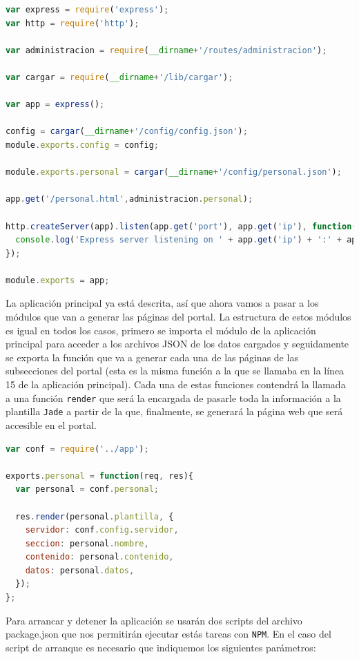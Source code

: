 \begin{lstlisting}[language=javascript,caption={Archivo app.js},label={lst:appjs}]
var express = require('express');
var http = require('http');

var administracion = require(__dirname+'/routes/administracion');

var cargar = require(__dirname+'/lib/cargar');

var app = express();

config = cargar(__dirname+'/config/config.json');
module.exports.config = config;

module.exports.personal = cargar(__dirname+'/config/personal.json');

app.get('/personal.html',administracion.personal);

http.createServer(app).listen(app.get('port'), app.get('ip'), function(){
  console.log('Express server listening on ' + app.get('ip') + ':' + app.get('port'));
});

module.exports = app;
\end{lstlisting}

La aplicación principal ya está descrita, así que ahora vamos a pasar a los módulos que van a generar las páginas del portal. La estructura de estos módulos es igual en todos los casos, primero se importa el módulo de la aplicación principal para acceder a los archivos JSON de los datos cargados y seguidamente se exporta la función que va a generar cada una de las páginas de las subsecciones del portal (esta es la misma función a la que se llamaba en la línea 15 de la aplicación principal). Cada una de estas funciones contendrá la llamada a una función {\tt render} que será la encargada de pasarle toda la información a la plantilla {\tt Jade} a partir de la que, finalmente, se generará la página web que será accesible en el portal.

\newpage 

\begin{lstlisting}[language=javascript,caption={Archivo administracion.js},label={lst:adminjs}]
var conf = require('../app');

exports.personal = function(req, res){
  var personal = conf.personal;

  res.render(personal.plantilla, {
    servidor: conf.config.servidor,
    seccion: personal.nombre,
    contenido: personal.contenido,
    datos: personal.datos,
  });
};
\end{lstlisting}

Para arrancar y detener la aplicación se usarán dos scripts del archivo {\\package.json} que nos permitirán ejecutar estás tareas con {\tt NPM}. En el caso del script de arranque es necesario que indiquemos los siguientes parámetros:

